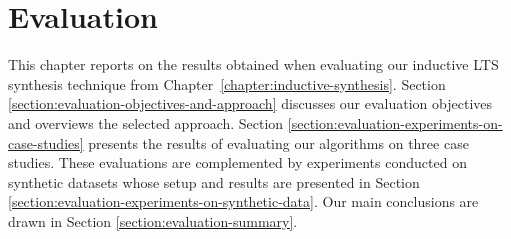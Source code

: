 \chapter{Evaluation\label{chapter:evaluation}}

This chapter reports on the results obtained when evaluating our inductive LTS synthesis technique from Chapter~\ref{chapter:inductive-synthesis}. Section \ref{section:evaluation-objectives-and-approach} discusses our evaluation objectives and overviews the selected approach. Section \ref{section:evaluation-experiments-on-case-studies} presents the results of evaluating our algorithms on three case studies. These evaluations are complemented by experiments conducted on synthetic datasets whose setup and results are presented in Section \ref{section:evaluation-experiments-on-synthetic-data}. Our main conclusions are drawn in Section \ref{section:evaluation-summary}.





